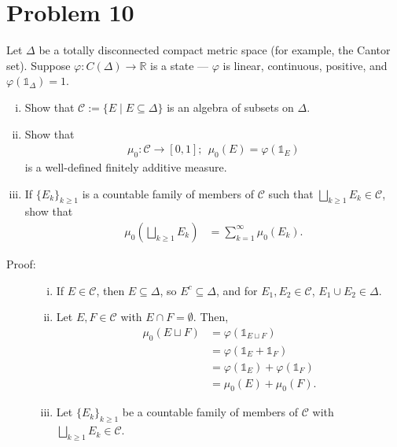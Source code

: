 \documentclass[10pt]{extarticle}
\newcommand{\R}{\mathbb{R}}
\begin{document}
  \section{Problem 10}%
  Let $\Delta$ be a totally disconnected compact metric space (for example, the Cantor set). Suppose $\varphi: C(\Delta)\rightarrow \R$ is a state --- $\varphi$ is linear, continuous, positive, and $\varphi\left(\mathbb{1}_{\Delta}\right) = 1$.
  \begin{enumerate}[(i)]
    \item Show that $\mathcal{C} := \{E\mid E\subseteq \Delta\}$ is an algebra of subsets on $\Delta$.
    \item Show that
      \begin{align*}
        \mu_0: \mathcal{C}\rightarrow [0,1];~~\mu_0(E) = \varphi\left(\mathbb{1}_{E}\right)
      \end{align*}
      is a well-defined finitely additive measure.
    \item If $\{E_k\}_{k\geq 1}$ is a countable family of members of $\mathcal{C}$ such that $\bigsqcup_{k\geq 1}E_k \in \mathcal{C}$, show that
      \begin{align*}
        \mu_0\left(\bigsqcup_{k\geq 1}E_k\right) &= \sum_{k=1}^{\infty}\mu_0(E_k).
      \end{align*}
  \end{enumerate}
  \begin{description}
    \item[Proof:]\hfill
      \begin{enumerate}[(i)]
        \item If $E\in \mathcal{C}$, then $E\subseteq \Delta$, so $E^{c}\subseteq \Delta$, and for $E_1,E_2\in \mathcal{C}$, $E_1\cup E_2\in \Delta$.
        \item Let $E,F\in \mathcal{C}$ with $E \cap F = \emptyset$. Then,
          \begin{align*}
            \mu_0(E\sqcup F) &= \varphi\left(\mathbb{1}_{E\sqcup F}\right)\\
                           &= \varphi\left(\mathbb{1}_{E} + \mathbb{1}_{F}\right)\\
                           &= \varphi\left(\mathbb{1}_{E}\right) + \varphi\left(\mathbb{1}_{F}\right)\\
                           &= \mu_0(E) + \mu_0(F).
          \end{align*}
        \item Let $\{E_k\}_{k\geq 1}$ be a countable family of members of $\mathcal{C}$ with $\bigsqcup_{k\geq 1}E_k\in \mathcal{C}$.
      \end{enumerate}
  \end{description}
\end{document}

